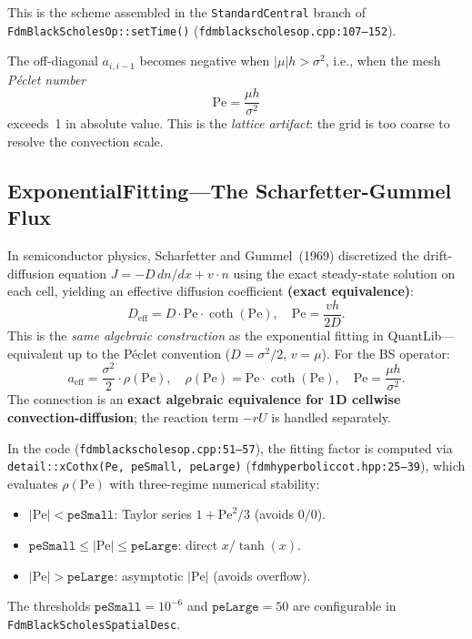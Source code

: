 This is the scheme assembled in the \texttt{StandardCentral} branch of \texttt{FdmBlackScholesOp::setTime()} (\texttt{fdmblackscholesop.cpp:107--152}).

The off-diagonal $a_{i,i-1}$ becomes negative when $|\mu|h > \sigma^2$, i.e., when the mesh \emph{P\'{e}clet number}
\begin{equation}\label{eq:peclet}
  \mathrm{Pe} = \frac{\mu h}{\sigma^2}
\end{equation}
exceeds~1 in absolute value.  This is the \emph{lattice artifact}: the grid is too coarse to resolve the convection scale.

\subsection{ExponentialFitting---The Scharfetter-Gummel Flux}

In semiconductor physics, Scharfetter and Gummel~(1969) discretized the drift-diffusion equation $J = -D\,dn/dx + v \cdot n$ using the exact steady-state solution on each cell, yielding an effective diffusion coefficient \textbf{(exact equivalence)}:
\begin{equation}\label{eq:sg-deff}
  D_{\text{eff}} = D \cdot \mathrm{Pe} \cdot \coth(\mathrm{Pe}),
  \quad \mathrm{Pe} = \frac{vh}{2D}.
\end{equation}
This is the \emph{same algebraic construction} as the exponential fitting in QuantLib---equivalent up to the P\'{e}clet convention ($D = \sigma^2/2$, $v = \mu$).  For the BS operator:
\begin{equation}\label{eq:ef-aeff}
  a_{\text{eff}} = \frac{\sigma^2}{2} \cdot \rho(\mathrm{Pe}),
  \quad \rho(\mathrm{Pe}) = \mathrm{Pe} \cdot \coth(\mathrm{Pe}),
  \quad \mathrm{Pe} = \frac{\mu h}{\sigma^2}.
\end{equation}
The connection is an \textbf{exact algebraic equivalence for 1D cellwise convection-diffusion}; the reaction term $-rU$ is handled separately.

In the code (\texttt{fdmblackscholesop.cpp:51--57}), the fitting factor is computed via \texttt{detail::xCothx(Pe, peSmall, peLarge)} (\texttt{fdmhyperboliccot.hpp:25--39}), which evaluates $\rho(\mathrm{Pe})$ with three-regime numerical stability:
\begin{itemize}
  \item $|\mathrm{Pe}| < \texttt{peSmall}$: Taylor series $1 + \mathrm{Pe}^2/3$ (avoids $0/0$).
  \item $\texttt{peSmall} \le |\mathrm{Pe}| \le \texttt{peLarge}$: direct $x/\tanh(x)$.
  \item $|\mathrm{Pe}| > \texttt{peLarge}$: asymptotic $|\mathrm{Pe}|$ (avoids overflow).
\end{itemize}
The thresholds $\texttt{peSmall} = 10^{-6}$ and $\texttt{peLarge} = 50$ are configurable in \texttt{FdmBlackScholesSpatialDesc}.

